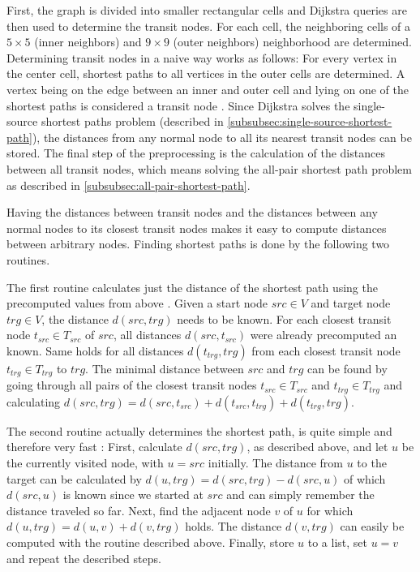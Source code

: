 			First, the graph is divided into smaller rectangular cells and Dijkstra queries are then used to determine the transit nodes.
			For each cell, the neighboring cells of a $5 \times 5$ (inner neighbors) and $9 \times 9$ (outer neighbors) neighborhood are determined.
			Determining transit nodes in a naive way works as follows:
			For every vertex in the center cell, shortest paths to all vertices in the outer cells are determined.
			A vertex being on the edge between an inner and outer cell and lying on one of the shortest paths is considered a transit node \cite[6]{bast-transit}.
			Since Dijkstra solves the single-source shortest paths problem (described in \cref{subsubsec:single-source-shortest-path}), the distances from any normal node to all its nearest transit nodes can be stored.
			The final step of the preprocessing is the calculation of the distances between all transit nodes, which means solving the all-pair shortest path problem as described in \cref{subsubsec:all-pair-shortest-path}.
			
			Having the distances between transit nodes and the distances between any normal nodes to its closest transit nodes makes it easy to compute distances between arbitrary nodes.
			Finding shortest paths is done by the following two routines.
			
			The first routine calculates just the distance of the shortest path using the precomputed values from above \cite[7-8]{bast-transit}.
			Given a start node $src \in V$ and target node $trg \in V$, the distance $d(src, trg)$ needs to be known.
			For each closest transit node $t_{src} \in T_{src}$ of $src$, all distances $d(src, t_{src})$ were already precomputed an known.
			Same holds for all distances $d(t_{trg}, trg)$ from each closest transit node $t_{trg} \in T_{trg}$ to $trg$.
			The minimal distance between $src$ and $trg$ can be found by going through all pairs of the closest transit nodes $t_{src} \in T_{src}$ and $t_{trg} \in T_{trg}$ and calculating $d(src, trg) = d(src, t_{src}) + d(t_{src}, t_{trg}) + d(t_{trg}, trg)$.
			
			The second routine actually determines the shortest path, is quite simple and therefore very fast \cite[8]{bast-transit}:
			First, calculate $d(src, trg)$, as described above, and let $u$ be the currently visited node, with $u = src$ initially.
			The distance from $u$ to the target can be calculated by $d(u, trg) = d(src, trg) - d(src, u)$ of which $d(src, u)$ is known since we started at $src$ and can simply remember the distance traveled so far.
			Next, find the adjacent node $v$ of $u$ for which $d(u, trg) = d(u, v) + d(v, trg)$ holds.
			The distance $d(v, trg)$ can easily be computed with the routine described above.
			Finally, store $u$ to a list, set $u = v$ and repeat the described steps.
			

